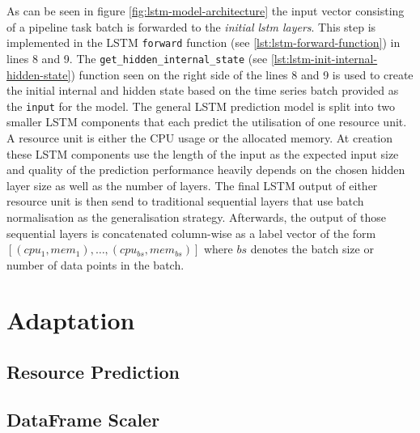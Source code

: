   As can be seen in figure \ref{fig:lstm-model-architecture} the input vector consisting of a pipeline task batch is forwarded to the \emph{initial lstm layers}. This step is implemented in the LSTM \texttt{forward} function (see \ref{lst:lstm-forward-function}) in lines 8 and 9. The \texttt{get\_hidden\_internal\_state} (see \ref{lst:lstm-init-internal-hidden-state}) function seen on the right side of the lines 8 and 9 is used to create the initial internal and hidden state based on the time series batch provided as the \texttt{input} for the model.
  The general LSTM prediction model is split into two smaller LSTM components that each predict the utilisation of one resource unit. A resource unit is either the CPU usage or the allocated memory. At creation these LSTM components use the length of the input as the expected input size and quality of the prediction performance heavily depends on the chosen hidden layer size as well as the number of  layers.
  The final LSTM output of either resource unit is then send to traditional sequential layers that use batch normalisation as the generalisation strategy.
  Afterwards, the output of those sequential layers is concatenated column-wise as a label vector of the form $\left[(cpu_1, mem_1), \dots, (cpu_{bs}, mem_{bs})\right]$ where $bs$ denotes the batch size or number of data points in the batch.

  



  

  



  

\section{Adaptation}
  \subsection{Resource Prediction}
  \subsection{DataFrame Scaler}
